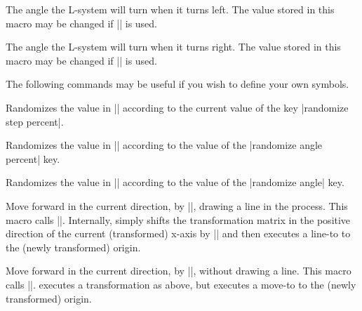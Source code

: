 \begin{command}{\pgfdeclarelindenmayersystem{}}
\begin{command}{\symbol{}}
        \begin{command}{\pgflsystemcurrentleftangle}
            The angle the L-system will turn when it turns left.
            The value stored in this macro may be changed if
            |\pgflsystemrandomizeleftangle| is used.
        \end{command}

        \begin{command}{\pgflsystemcurrentrightangle}
            The angle the L-system will turn when it turns right.
            The value stored in this macro may be changed if
            |\pgflsystemrandomizerightangle| is used.
        \end{command}

        The following commands may be useful if you wish to define your own
        symbols.

        \begin{command}{\pgflsystemrandomizestep}
            Randomizes the value in |\pgflsystemcurrentstep| according to the
            current value of the key |randomize step percent|.
        \end{command}

        \begin{command}{\pgflsystemrandomizeleftangle}
            Randomizes the value in |\pgflsystemcurrentleftangle| according to
            the value of the |randomize angle percent| key.
        \end{command}

        \begin{command}{\pgflsystemrandomizerightangle}
            Randomizes the value in |\pgflsystemcurrentrightangle| according
            to the value of the |randomize angle| key.
        \end{command}

        \begin{command}{\pgflsystemdrawforward}
            Move forward in the current direction, by |\pgflsystemcurrentstep|,
            drawing a line in the process. This macro calls
            |\pgflsystemrandomizestep|. Internally, \pgfname{} simply shifts
            the transformation matrix in the positive direction of the current
            (transformed) x-axis by |\pgflsystemstep| and then executes a
            line-to to the (newly transformed) origin.
        \end{command}

        \begin{command}{\pgflsystemmoveforward}
            Move forward in the current direction, by |\pgflsystemcurrentstep|,
            without drawing a line. This macro calls
            |\pgflsystemrandomizestep|. \pgfname{} executes a transformation as
            above, but executes a move-to to the (newly transformed) origin.
        \end{command}


\end{command}
\end{command}
